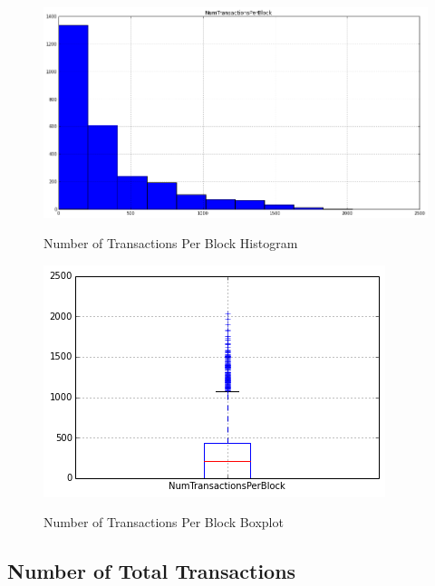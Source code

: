 \begin{figure}[bth]
  \myfloatalign
  {\includegraphics[width=1\linewidth]
    {gfx/n-transactions-per-block-histogram}}
  \caption{Number of Transactions Per Block
    Histogram}
  \label{fig:n-transactions-per-block-histogram}
\end{figure}

\begin{figure}[bth]
  \myfloatalign
  {\includegraphics[width=1\linewidth]
    {gfx/n-transactions-per-block-boxplot}}
  \caption{Number of Transactions Per Block
    Boxplot}
  \label{fig:n-transactions-per-block-boxplot}
\end{figure}

\clearpage

\subsection{Number of Total Transactions}
\label{sec:n-transactions-total}


